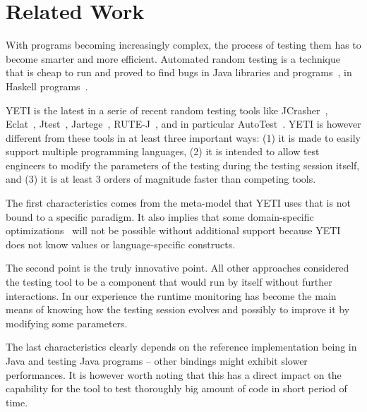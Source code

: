 \section{Related Work}\label{sec:rw}

With programs becoming increasingly complex, the process of testing 
them has to become smarter and more efficient. Automated random testing
is a technique that is cheap to run and proved to find bugs in Java libraries and 
programs~\cite{Pacheco2005,Csallner2004}, in Haskell 
programs~\cite{Claessen00quickcheck:a}.

YETI is the latest in a serie of recent random testing tools like
JCrasher~\cite{Csallner2004}, Eclat~\cite{Pacheco2005}, Jtest~\cite{Jtest},
Jartege~\cite{Oriat2004}, RUTE-J~\cite{Andrews2006a}, and in particular 
AutoTest~\cite{Ciupa2007,CLOM:08:AARTOO,CPLOM:08:PRTOOS}. YETI is however 
different from these tools in at least three important ways: (1) it is made to 
easily support multiple programming languages, (2) 
it is intended to allow test engineers to modify the parameters of the 
testing during the testing session itself, and (3) it is at least 3 orders 
of magnitude faster than competing tools. 

The first characteristics comes from
the meta-model that YETI uses that is not bound to a specific paradigm.
It also implies that some domain-specific optimizations~\cite{Pacheco2007,Godefroid2005,Chen2004a,Chen2005} will not be possible 
without additional support because YETI does not know values or language-specific
constructs. 

The second point is the truly innovative point. All other approaches
considered the testing tool to be a component that would run by itself without 
further interactions. In our experience the runtime monitoring has become 
the main means of knowing how the testing session evolves and possibly to 
improve it by modifying some parameters. 

The last characteristics 
clearly depends on the reference implementation being in Java and testing Java
programs -- other bindings might exhibit slower performances. It is however 
worth noting that this has a direct impact on the capability for the tool to 
test thoroughly big amount of code in short period of time.
